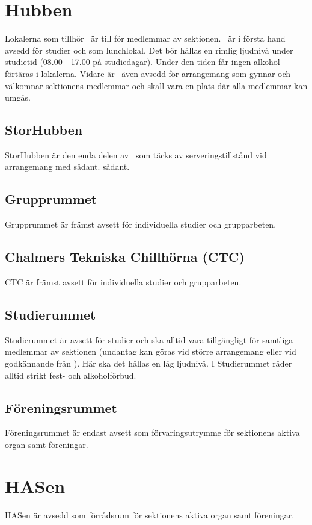 \documentclass[11pt, includeaddress]{classes/cthit}
\begin{document}
\section{Hubben}
Lokalerna som tillhör \HUBBEN\ är till för medlemmar av sektionen. \HUBBEN\ är i första hand avsedd för
studier och som lunchlokal. Det bör hållas en rimlig ljudnivå under studietid (08.00­ - 17.00 på
studiedagar). Under den tiden får ingen alkohol förtäras i lokalerna. Vidare är \HUBBEN\ även avsedd för
arrangemang som gynnar och välkomnar sektionens medlemmar och skall vara en plats där alla
medlemmar kan umgås.

\subsection{StorHubben}
StorHubben är den enda delen av \HUBBEN\ som täcks av serveringstillstånd vid
arrangemang med sådant.
sådant.

\subsection{Grupprummet}
Grupprummet är främst avsett för individuella studier och grupparbeten.

\subsection{Chalmers Tekniska Chillhörna (CTC)}
CTC är främst avsett för individuella studier och grupparbeten.

\subsection{Studierummet}
Studierummet är avsett för studier och ska alltid vara tillgängligt för samtliga medlemmar av sektionen (undantag kan göras vid större arrangemang eller vid godkännande från \STYRIT{}). Här ska det hållas en låg ljudnivå.
\newline
I Studierummet råder alltid strikt fest- och alkoholförbud.

\subsection{Föreningsrummet}
Föreningsrummet är endast avsett som förvaringsutrymme för sektionens aktiva organ samt föreningar.


\section{HASen}
HASen är avsedd som förrådsrum för sektionens aktiva organ samt föreningar.
\end{document}
